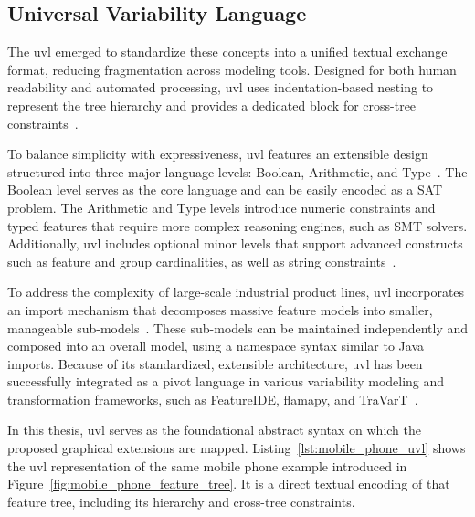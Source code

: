 \subsection{Universal Variability Language}
\label{subsec:bg_uvl}

The \gls{uvl} emerged to standardize these concepts into a unified textual exchange format, reducing fragmentation across modeling tools. 
Designed for both human readability and automated processing, \gls{uvl} uses indentation-based nesting to represent the tree hierarchy and provides a dedicated block for cross-tree constraints~\cite{sundermann_integration_2021, sundermann_yet_2021}. 

To balance simplicity with expressiveness, \gls{uvl} features an extensible design structured into three major language levels: Boolean, Arithmetic, and Type~\cite{sundermann_yet_2021}. 
The Boolean level serves as the core language and can be easily encoded as a SAT problem.
The Arithmetic and Type levels introduce numeric constraints and typed features that require more complex reasoning engines, such as SMT solvers. 
Additionally, \gls{uvl} includes optional minor levels that support advanced constructs such as feature and group cardinalities, as well as string constraints~\cite{sundermann_yet_2021}.

To address the complexity of large-scale industrial product lines, \gls{uvl} incorporates an import mechanism that decomposes massive feature models into smaller, manageable sub-models~\cite{sundermann_yet_2021}. 
These sub-models can be maintained independently and composed into an overall model, using a namespace syntax similar to Java imports. 
Because of its standardized, extensible architecture, \gls{uvl} has been successfully integrated as a pivot language in various variability modeling and transformation frameworks, such as FeatureIDE, flamapy, and TraVarT~\cite{sundermann_integration_2021}.



In this thesis, \gls{uvl} serves as the foundational abstract syntax on which the proposed graphical extensions are mapped.
Listing~\ref{lst:mobile_phone_uvl} shows the \gls{uvl} representation of the same mobile phone example introduced in Figure~\ref{fig:mobile_phone_feature_tree}.
It is a direct textual encoding of that feature tree, including its hierarchy and cross-tree constraints.
